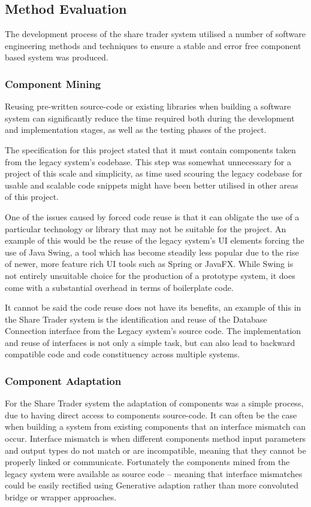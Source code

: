\documentclass[12pt, a4paper,titlepage]{article}
\begin{document}
\subsection{Method Evaluation}
The development process of the share trader system utilised a number of
software engineering methods and techniques to ensure a stable and error free
component  based system was produced.  

\subsubsection{Component Mining}
Reusing pre-written source-code or existing libraries when building a software
system can significantly reduce the time required both during the development
and implementation stages, as well as the testing phases of the project.

The specification for this project stated that it must contain components
taken from the legacy system’s codebase. This step was somewhat unnecessary
for a project of this scale and simplicity, as time used scouring the legacy
codebase for usable   and scalable code snippets might have been better
utilised in other areas of this project.

One of the issues caused by forced code reuse is that it can obligate the use
of a particular technology or library that may not be suitable for the
project. An example of this would be the reuse of the legacy system’s UI
elements forcing the use of Java Swing, a tool which has become steadily less
popular due to the rise of newer, more feature rich UI tools such as Spring or
JavaFX. While Swing is not entirely unsuitable choice for the production of a
prototype system, it does come with a substantial overhead in terms of
boilerplate code.

It cannot be said the code reuse does not have its benefits, an example of
this in the Share Trader system is the identification and reuse of the
Database Connection interface from the Legacy system’s source code. The
implementation and reuse of interfaces is not only a simple task, but can also
lead to backward compatible code and code constituency across multiple
systems.

\subsubsection{Component Adaptation}
For the Share Trader system the adaptation of components was a simple process,
due to having direct access to components source-code. It can often be the
case when building a system from existing components that an interface
mismatch can occur. Interface mismatch is when different components method
input parameters and output types do not match or are incompatible, meaning
that they cannot be properly linked or communicate.  Fortunately the
components mined from the legacy system were available as source code –
meaning that interface mismatches could be easily rectified  using Generative
adaption rather than more convoluted bridge or wrapper approaches.
\end{document}
